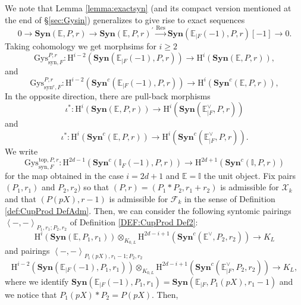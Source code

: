 \documentclass[asterisque,english]{smfart}
\begin{document}
We note that Lemma \ref{lemma:exactsyn} (and its compact version mentioned
at the end of \S \ref{sec:Gysin}) generalizes to give rise to exact sequences
\begin{equation}\label{CupProd F GysEx}
0\longrightarrow \mathbf{Syn}\left( \mathbb{E},P,r\right)
\longrightarrow \mathbf{Syn}\left( \mathbb{E},P,r\right)
^{\prime }\stackrel{\mathrm{Res}}{\longrightarrow }\mathbf{Syn}\left( \mathbb{E}_{\mid F}\left( -1\right),P,r \right) \left[
-1\right] \longrightarrow 0. 
\end{equation}
Taking cohomology we get morphsims for $i\geq 2$
$$
\mathrm{Gys}_{\mathrm{syn},F}^{P,r}\colon \mathrm{H}^{i-2}\left( 
\mathbf{Syn}\left( \mathbb{E}_{\mid F}\left( -1\right),P,r
\right) \right) \longrightarrow \mathrm{H}^{i}\left( \mathbf{Syn}
\left( \mathbb{E},P,r\right) \right) ,
$$and
$$
\mathrm{Gys}_{\mathrm{syn}^c,F}^{P,r}\colon \mathrm{H}^{i-2}\left( 
\mathbf{Syn}^c\left( \mathbb{E}_{\mid F}\left( -1\right),P,r
\right) \right) \longrightarrow \mathrm{H}^{i}\left( \mathbf{Syn}^c
\left( \mathbb{E},P,r\right) \right) ,
$$
In the opposite direction, there are pull-back morphisms
$$
\iota ^{\ast }\colon \mathrm{H}^{i}\left( \mathbf{Syn}\left( 
\mathbb{E},P,r\right) \right) \longrightarrow \mathrm{H}^{i}\left( 
\mathbf{Syn}\left( \mathbb{E}_{\mid F}^{\vee },P,r\right)\right)$$and
$$
\iota ^{\ast }\colon \mathrm{H}^{i}\left( \mathbf{Syn}^c\left( 
\mathbb{E},P,r\right) \right) \longrightarrow \mathrm{H}^{i}\left( 
\mathbf{Syn}^c\left( \mathbb{E}_{\mid F}^{\vee },P,r\right)\right).$$We write
$$
\mathrm{Gys}_{\mathrm{syn},F}^{\mathrm{top},P,r}:\mathrm{H}^{2d-1}\left( 
\mathbf{Syn}^c\left( \mathbb{I}_{F}\left( -1\right),P,r \right) \right)
\longrightarrow \mathrm{H}^{2d+1}\left( \mathbf{Syn}^c\left( \mathbb{
I},P,r\right) \right)
$$
for the map obtained in the case $i=2d+1$ and $\mathbb{E}=\mathbb{I}$ 
the unit object. Fix pairs $(P_1,r_1)$ and $P_2,r_2)$ so that $( P,r)=(P_1\ast P_2, r_1+r_2) $ 
is admissible for $\mathcal{X}_k$ and that $\left( P\left( pX\right) ,r-1\right) $ is
admissible for $\mathcal{F}_k$ in the sense of Definition \ref{def:CupProd DefAdm}. Then, we can consider the following syntomic pairings $\left\langle -,-\right\rangle_{P_{1},r_{1};P_{2},r_{2}}$ of
Definition \ref{DEF:CupProd Def2}:
$$ \mathrm{H}^{i}\left(
\mathbf{Syn}\left( \mathbb{E},P_1,r_1\right) \right) \otimes
_{K_{0,L}}\mathrm{H}^{2d-i+1}\left( \mathbf{Syn}^{c}\left(
\mathbb{E}^{\vee },P_2,r_2\right) \right) \longrightarrow K_{L}$$and pairings
$\left\langle -,-\right\rangle_{P_{1}\left( pX\right) ,r_{1}-1;P_{2},r_{2}}$
$$
\mathrm{H}^{i-2}\left( \mathbf{Syn}\left(
\mathbb{E}_{\mid F}\left( -1\right),P_1,r_1 \right) \right) \otimes
_{K_{0,L}}\mathrm{H}^{2d-i+1}\left( \mathbf{Syn}^{c}\left(
\mathbb{E}_{\mid F}^{\vee },P_2,r_2\right) \right) \longrightarrow
K_{L},
$$where we identify $
\mathbf{Syn}\left( \mathbb{E}_{\mid F}\left( -1\right),P_1,r_1
\right) =\mathbf{Syn}\left( \mathbb{E}
_{\mid F},P_{1}( pX) ,r_{1}-1\right) $ and we notice that $P_{1}\left( pX\right) \ast
P_{2}=P\left( pX\right) $. Then,
\end{document}
